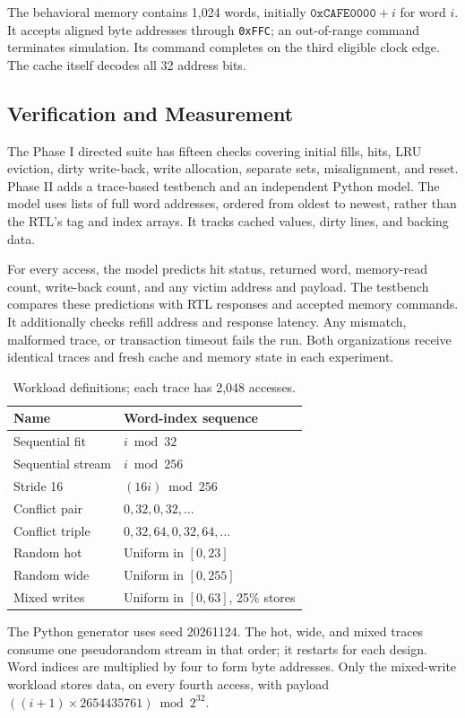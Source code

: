 \documentclass[conference]{IEEEtran}
\begin{document}
The behavioral memory contains 1,024 words, initially
$\mathtt{0xCAFE0000}+i$ for word $i$. It accepts aligned byte addresses
through \texttt{0xFFC}; an out-of-range command terminates simulation.
Its command completes on the third eligible clock edge. The cache itself
decodes all 32 address bits.

\subsection{Verification and Measurement}
The Phase I directed suite has fifteen checks covering initial fills,
hits, LRU eviction, dirty write-back, write allocation, separate sets,
misalignment, and reset. Phase II adds a trace-based testbench and an
independent Python model. The model uses lists of full word addresses,
ordered from oldest to newest, rather than the RTL's tag and index arrays.
It tracks cached values, dirty lines, and backing data.

For every access, the model predicts hit status, returned word, memory-read
count, write-back count, and any victim address and payload. The testbench
compares these predictions with RTL responses and accepted memory commands.
It additionally checks refill address and response latency. Any mismatch,
malformed trace, or transaction timeout fails the run. Both organizations
receive identical traces and fresh cache and memory state in each experiment.

\begin{table}[t]
\caption{Workload definitions; each trace has 2,048 accesses.}
\label{tab:workloads}
\centering\small
\begin{tabular}{ll}
\toprule
Name & Word-index sequence \\
\midrule
Sequential fit & $i\bmod32$ \\
Sequential stream & $i\bmod256$ \\
Stride 16 & $(16i)\bmod256$ \\
Conflict pair & $0,32,0,32,\ldots$ \\
Conflict triple & $0,32,64,0,32,64,\ldots$ \\
Random hot & Uniform in $[0,23]$ \\
Random wide & Uniform in $[0,255]$ \\
Mixed writes & Uniform in $[0,63]$, 25\% stores \\
\bottomrule
\end{tabular}
\end{table}

The Python generator uses seed 20261124. The hot, wide, and mixed traces
consume one pseudorandom stream in that order; it restarts for each design.
Word indices are multiplied by four to form byte addresses.
Only the mixed-write workload stores data, on every fourth access, with
payload $((i+1)\times2654435761)\bmod2^{32}$.
\end{document}
